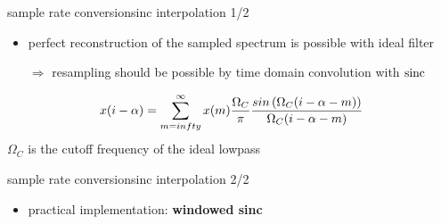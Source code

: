 	\begin{frame}{sample rate conversion}{sinc interpolation 1/2}
        \begin{itemize}
            \item   perfect reconstruction of the sampled spectrum is possible with ideal filter
            \item   [$\Rightarrow$] resampling should be possible by time domain convolution with $\operatorname*{sinc}$
        \end{itemize}
            \pause
            \begin{equation*}
                x(i-\alpha) = \sum\limits_{m=\-infty}^{\infty}x(m)\frac{\Omega_C}{\pi}\frac{sin\left(\Omega_C(i-\alpha-m)\right)}{\Omega_C(i-\alpha-m)}
            \end{equation*}
            $\Omega_C$ is the cutoff frequency of the  ideal lowpass
    \end{frame}
	\begin{frame}{sample rate conversion}{sinc interpolation 2/2}
        \begin{itemize}
            \item   practical implementation: \textbf{windowed sinc}
        \end{itemize}
    \end{frame}
